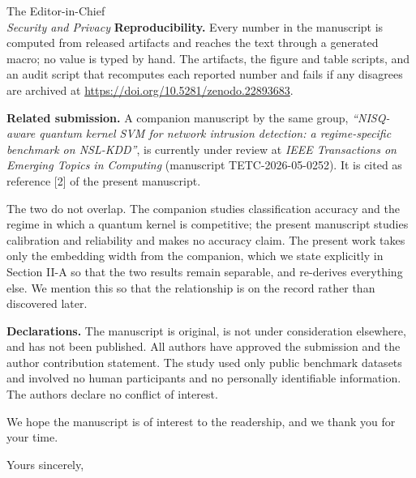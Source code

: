 \documentclass[11pt]{letter}
\begin{document}
\begin{letter}{%
  The Editor-in-Chief\\
  \textit{Security and Privacy}}
\medskip
\noindent\textbf{Reproducibility.}
Every number in the manuscript is computed from released artifacts and reaches the
text through a generated macro; no value is typed by hand. The artifacts, the
figure and table scripts, and an audit script that recomputes each reported number
and fails if any disagrees are archived at
\href{https://doi.org/10.5281/zenodo.22893683}{https://doi.org/10.5281/zenodo.22893683}.

\medskip
\noindent\textbf{Related submission.}
A companion manuscript by the same group, \textit{``NISQ-aware quantum kernel SVM
for network intrusion detection: a regime-specific benchmark on NSL-KDD''}, is
currently under review at \textit{IEEE Transactions on Emerging Topics in
Computing} (manuscript TETC-2026-05-0252). It is cited as reference [2] of the
present manuscript.

The two do not overlap. The companion studies classification accuracy and the
regime in which a quantum kernel is competitive; the present manuscript studies
calibration and reliability and makes no accuracy claim. The present work takes
only the embedding width from the companion, which we state explicitly in Section
II-A so that the two results remain separable, and re-derives everything else. We
mention this so that the relationship is on the record rather than discovered
later.

\medskip
\noindent\textbf{Declarations.}
The manuscript is original, is not under consideration elsewhere, and has not been
published. All authors have approved the submission and the author contribution
statement. The study used only public benchmark datasets and involved no human
participants and no personally identifiable information. The authors declare no
conflict of interest.

\medskip
We hope the manuscript is of interest to the readership, and we thank you for your
time.

\closing{Yours sincerely,}

\end{letter}
\end{document}
